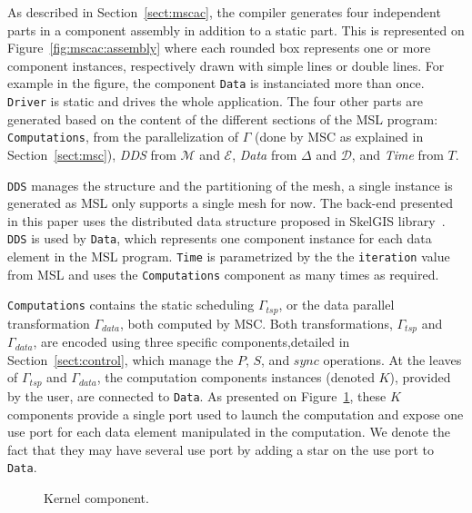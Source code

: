 As described in Section~\ref{sect:mscac}, the compiler generates four independent parts in a component assembly in addition to a static part.
This is represented on Figure~\ref{fig:mscac:assembly} where each rounded box represents one or more component instances, respectively drawn with simple lines or double lines. For example in the figure, the component \texttt{Data} is instanciated more than once.
\texttt{Driver} is static and drives the whole application.
The four other parts are generated based on the content of the different sections of the MSL program: \texttt{Computations}, from the parallelization of $\Gamma$ (done by MSC as explained in Section~\ref{sect:msc}), \emph{DDS} from $\mathcal{M}$ and $\mathcal{E}$, \emph{Data} from $\Delta$ and $\mathcal{D}$, and \emph{Time} from $T$.


\texttt{DDS} manages the structure and the partitioning of the mesh, a single instance is generated as MSL only supports a single mesh for now.
The back-end presented in this paper uses the distributed data structure proposed in SkelGIS library~\cite{CPE:CPE3494}.
\texttt{DDS} is used by \texttt{Data}, which represents one component instance for each data element in the MSL program.
\texttt{Time} is parametrized by the the \texttt{iteration} value from MSL and uses the \texttt{Computations} component as many times as required.

\texttt{Computations} contains the static scheduling $\Gamma_{tsp}$, or the data parallel transformation $\Gamma_{data}$, both computed by MSC.
Both transformations, $\Gamma_{tsp}$ and $\Gamma_{data}$, are encoded using three specific components,detailed in Section~\ref{sect:control}, which manage the $P$, $S$, and $sync$ operations.
At the leaves of $\Gamma_{tsp}$ and $\Gamma_{data}$, the computation components instances (denoted $K$), provided by the user, are connected to \texttt{Data}.
As presented on Figure~\ref{fig:k}, these $K$ components provide a single port used to launch the computation and expose one use port for each data element manipulated in the computation.
We denote the fact that they may have several use port by adding a star on the use port to \texttt{Data}.

\begin{figure}
\begin{center}
\end{center}
\caption{Kernel component.}
\label{fig:k}
\end{figure}

